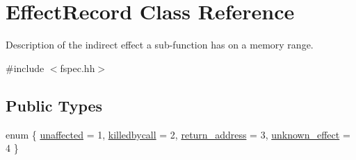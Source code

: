 \hypertarget{class_effect_record}{}\section{Effect\+Record Class Reference}
\label{class_effect_record}


Description of the indirect effect a sub-\/function has on a memory range.  




{\ttfamily \#include $<$fspec.\+hh$>$}

\subsection*{Public Types}
\begin{DoxyCompactItemize}
\item 
enum \{ \mbox{\hyperlink{class_effect_record_a9a77875d39274819c56d6e4df5f23ab0a3488da6d6b149499cbe384f7b57d0564}{unaffected}} = 1, 
\mbox{\hyperlink{class_effect_record_a9a77875d39274819c56d6e4df5f23ab0aacd8991c4ebdeb4057e15faf1d08abc2}{killedbycall}} = 2, 
\mbox{\hyperlink{class_effect_record_a9a77875d39274819c56d6e4df5f23ab0afa04c6c617a1044c79c7bc9b7d661be2}{return\+\_\+address}} = 3, 
\mbox{\hyperlink{class_effect_record_a9a77875d39274819c56d6e4df5f23ab0a02697f294ad0f4b53317da792c577a10}{unknown\+\_\+effect}} = 4
 \}
\end{DoxyCompactItemize}
